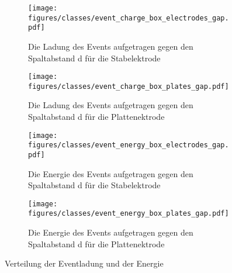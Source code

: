 \begin{figure}[H]
  \centering
  \begin{subfigure}[t]{0.48\textwidth}
    \centering
    \texttt{[image: figures/classes/event\_charge\_box\_electrodes\_gap.pdf]}
    \caption{Die Ladung des Events aufgetragen gegen den Spaltabstand d für die Stabelektrode}
    \label{fig:box-gap-eventcharge-stab}
  \end{subfigure}
  \begin{subfigure}[t]{0.48\textwidth}
    \centering
    \texttt{[image: figures/classes/event\_charge\_box\_plates\_gap.pdf]}
    \caption{Die Ladung des Events aufgetragen gegen den Spaltabstand d für die Plattenektrode}
    \label{fig:box-gap-event-charge-plate}
  \end{subfigure}
  \centering
  \begin{subfigure}[t]{0.48\textwidth}
    \centering
    \texttt{[image: figures/classes/event\_energy\_box\_electrodes\_gap.pdf]}
    \caption{Die Energie des Events aufgetragen gegen den Spaltabstand d für die Stabelektrode}
    \label{fig:box-gap-event-energy-stab}
  \end{subfigure}
  \begin{subfigure}[t]{0.48\textwidth}
    \centering
    \texttt{[image: figures/classes/event\_energy\_box\_plates\_gap.pdf]}
    \caption{Die Energie des Events aufgetragen gegen den Spaltabstand d für die Plattenektrode}
    \label{fig:box-gap-event-energy-plate}
  \end{subfigure}
  \caption{Verteilung der Eventladung und der Energie}
  \label{fig:box-gap-event-charge-energy}
\end{figure}

